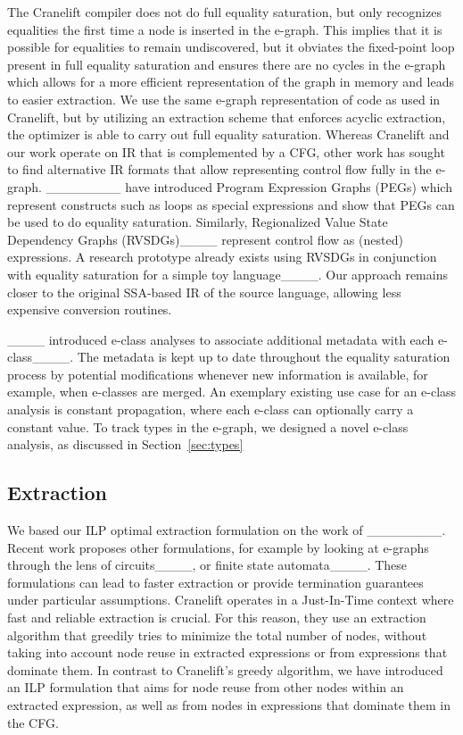 The Cranelift compiler does not do full equality saturation, but only recognizes equalities the first time a node is inserted in the e-graph.
This implies that it is possible for equalities to remain undiscovered, but it obviates the fixed-point loop present in full equality saturation and ensures there are no cycles in the e-graph which allows for a more efficient representation of the graph in memory and leads to easier extraction.
We use the same e-graph representation of code as used in Cranelift, but by utilizing an extraction scheme that enforces acyclic extraction, the optimizer is able to carry out full equality saturation.
Whereas Cranelift and our work operate on IR that is complemented by a CFG, other work has sought to find alternative IR formats that allow representing control flow fully in the e-graph.
________ have introduced Program Expression Graphs (PEGs) which represent constructs such as loops as special expressions and show that PEGs can be used to do equality saturation.
Similarly, Regionalized Value State Dependency Graphs (RVSDGs)____ represent control flow as (nested) expressions.
A research prototype already exists using RVSDGs in conjunction with equality saturation for a simple toy language____.
Our approach remains closer to the original SSA-based IR of the source language, allowing less expensive conversion routines.

____ introduced e-class analyses to associate additional metadata with each e-class____. The metadata is kept up to date throughout the equality saturation process by potential modifications whenever new information is available, for example, when e-classes are merged. An exemplary existing use case for an e-class analysis is constant propagation, where each e-class can optionally carry a constant value. To track types in the e-graph, we designed a novel e-class analysis, as discussed in Section~\ref{sec:types}


\subsection{Extraction}
We based our ILP optimal extraction formulation on the work of ________.
Recent work proposes other formulations, for example by looking at e-graphs through the lens of circuits____, or finite state automata____.
These formulations can lead to faster extraction or provide termination guarantees under particular assumptions.
Cranelift operates in a Just-In-Time context where fast and reliable extraction is crucial.
For this reason, they use an extraction algorithm that greedily tries to minimize the total number of nodes, without taking into account node reuse in extracted expressions or from expressions that dominate them.
In contrast to Cranelift's greedy algorithm, we have introduced an ILP formulation that aims for node reuse from other nodes within an extracted expression, as well as from nodes in expressions that dominate them in the CFG. 

